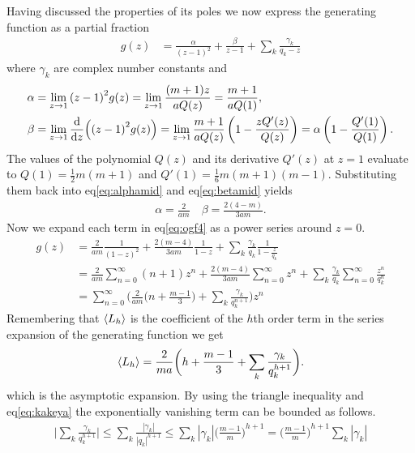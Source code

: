Having discussed the properties of its poles we now express the generating function as a partial fraction
\begin{align}
	g(z) &=
		\frac{\alpha}{{(z-1)}^2} + \frac{\beta}{z-1}
		+ \sum_k \frac{\gamma_k}{q_k-z}
	\label{eq:ogf4}
\end{align}
where $\gamma_k$ are complex number constants and
\begin{align}
	\alpha
		&= \lim\limits_{z \rightarrow 1}{(z-1)}^2 g(z)
		 = \lim\limits_{z \rightarrow 1} \frac{(m+1)z}{aQ(z)}
		 = \frac{m+1}{aQ(1)},\label{eq:alphamid}\\
	\beta
		&= \lim\limits_{z \rightarrow 1}\frac{\mathrm{d}}{\mathrm{d} z}\Big({(z-1)}^2 g(z)\Big)
		 = \lim\limits_{z \rightarrow 1} \frac{m+1}{aQ(z)}\left(1 - \frac{zQ'(z)}{Q(z)}\right)
		 = \alpha\left(1 - \frac{Q'(1)}{Q(1)}\right)\label{eq:betamid}.
\end{align}
The values of the polynomial $Q(z)$ and its derivative $Q'(z)$ at $z=1$ evaluate to $Q(1) = \frac{1}{2}m(m+1)$ and $Q'(1) = \frac{1}{6}m(m+1)(m-1)$. Substituting them back into eq\ref{eq:alphamid} and eq\ref{eq:betamid} yields
\begin{align}
	\alpha = \frac{2}{am} \quad
	\beta = \frac{2(4-m)}{3am}.
\end{align}
Now we expand each term in eq\ref{eq:ogf4} as a power series around $z=0$.
\begin{align*}
	g(z)
		\nonumber&= \frac{2}{am}\frac{1}{{(1-z)}^2} + \frac{2(m-4)}{3am}\frac{1}{1-z} + \sum_k\frac{\gamma_k}{q_k}\frac{1}{1-\frac{z}{q_k}}\\
		\nonumber&= \frac{2}{am}\sum_{n=0}^\infty (n+1) z^n + \frac{2(m-4)}{3am}\sum_{n=0}^\infty z^n + \sum_k \frac{\gamma_k}{q_k}\sum_{n=0}^\infty \frac{z^n}{q_k^n}\\
		&= \sum_{n=0}^\infty \bigg(\frac{2}{am}\Big(n + \frac{m - 1}{3}\Big) + \sum_k \frac{\gamma_k}{q_k^{n+1}}\bigg) z^n
\end{align*}
Remembering that $\left\langle L_h \right\rangle$ is the coefficient of the $h$th order term in the series expansion of the generating function we get
\begin{align}
	\left\langle L_h \right\rangle\label{eq:asymptotic1}
		= \frac{2}{ma}\bigg(h + \frac{m-1}{3} + \sum_k \frac{\gamma_k}{q_k^{h+1}}\bigg).
\end{align}
which is the asymptotic expansion. By using the triangle inequality and eq\ref{eq:kakeya} the exponentially vanishing term can be bounded as follows.
\begin{align}
	\bigg|\sum_k \frac{\gamma_k}{q_k^{h+1}}\bigg|
	\leq \sum_k \frac{|\gamma_k|}{|q_k|^{h+1}}
	\leq \sum_k |\gamma_k|{\Big(\frac{m-1}{m}\Big)}^{h+1}
	= {\Big(\frac{m-1}{m}\Big)}^{h+1}\sum_k |\gamma_k|
\end{align}
